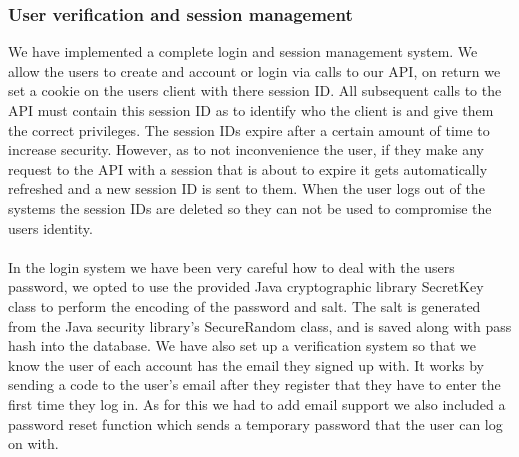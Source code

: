 \documentclass[10pt,a4paper]{article}
\begin{document}
\subsubsection{User verification and session management}
\noindent We have implemented a complete login and session management system. We 
allow the users to create and account or login via calls to our API, on return 
we set a cookie on the users client with there session ID. All subsequent calls 
to the API must contain this session ID as to identify who the client is and 
give them the correct privileges. The session IDs expire after a certain amount 
of time to increase security. However, as to not inconvenience the user, if they 
make any request to the API with a session that is about to expire it gets 
automatically refreshed and a new session ID is sent to them. When the user logs 
out of the systems the session IDs are deleted so they can not be used to 
compromise the users identity.
\\
\\
\noindent In the login system we have been very careful how to deal with the 
users password, we opted to use the provided Java cryptographic library SecretKey class 
to perform the encoding of the password and salt. The salt is generated from the 
Java security library’s SecureRandom class, and is saved along with pass hash 
into the database. We have also set up a verification system so that we know the 
user of each account has the email they signed up with. It works by sending a 
code to the user's email after they register that they have to enter the first 
time they log in. As for this we had to add email support we also included a 
password reset function which sends a temporary password that the user can log 
on with.  
\\
\\
\end{document}
